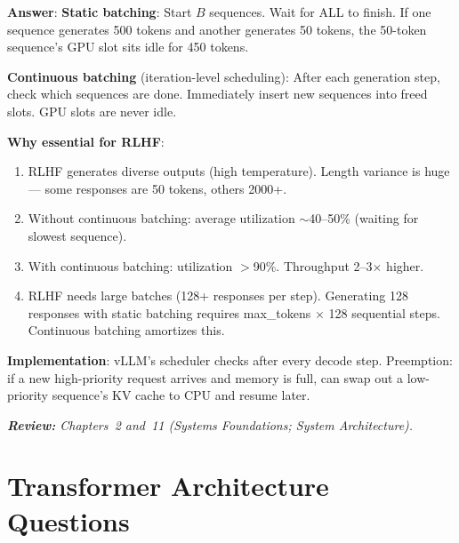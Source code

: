 \begin{questionbox}
\textbf{Answer}: \textbf{Static batching}: Start $B$ sequences. Wait for ALL to finish. If one sequence generates 500 tokens and another generates 50 tokens, the 50-token sequence’s GPU slot sits idle for 450 tokens.

\textbf{Continuous batching} (iteration-level scheduling): After each generation step, check which sequences are done. Immediately insert new sequences into freed slots. GPU slots are never idle.

\textbf{Why essential for RLHF}:

\begin{enumerate}
  \item RLHF generates diverse outputs (high temperature). Length variance is huge --- some responses are 50 tokens, others 2000+.
  \item Without continuous batching: average utilization $\sim$40--50\% (waiting for slowest sequence).
  \item With continuous batching: utilization $>$90\%. Throughput 2--3$\times$ higher.
  \item RLHF needs large batches (128+ responses per step). Generating 128 responses with static batching requires max\_tokens $\times$ 128 sequential steps. Continuous batching amortizes this.
\end{enumerate}

\textbf{Implementation}: vLLM’s scheduler checks after every decode step. Preemption: if a new high-priority request arrives and memory is full, can swap out a low-priority sequence’s KV cache to CPU and resume later.

\emph{\textbf{Review:} Chapters~2 and~11 (Systems Foundations; System Architecture).}
\end{questionbox}

\section{Transformer Architecture Questions}
\label{transformer-architecture-questions}

